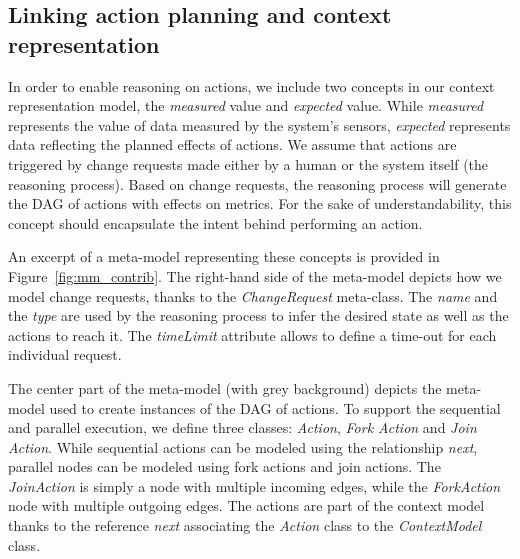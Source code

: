 \subsection{Linking action planning and context representation}


In order to enable reasoning on actions, we include two concepts in our context representation model, the \textit{measured} value and \textit{expected} value.
While \textit{measured} represents the value of data measured by the system's sensors, \textit{expected} represents data reflecting the planned effects of actions.
We assume that actions are triggered by change requests made either by a human or the system itself (\eg the reasoning process).
Based on change requests, the reasoning process will generate the DAG of actions with effects on metrics.
For the sake of understandability, this concept should encapsulate the intent behind performing an action.

An excerpt of a meta-model representing these concepts is provided in Figure~\ref{fig:mm_contrib}.
The right-hand side of the meta-model depicts how we model change requests, thanks to the \textit{ChangeRequest} meta-class.
The \textit{name} and the \textit{type} are used by the reasoning process to infer the desired state as well as the actions to reach it.
The \textit{timeLimit} attribute allows to define a time-out for each individual request.

The center part of the meta-model (with grey background) depicts the meta-model used to create instances of the DAG of actions. 
To support the sequential and parallel execution, we define three classes: \textit{Action}, \textit{Fork Action} and \textit{Join Action}.
While sequential actions can be modeled using the relationship \textit{next}, parallel nodes can be modeled using fork actions and join actions.
The \textit{JoinAction} is simply a node with multiple incoming edges, while the \textit{ForkAction} node with multiple outgoing edges.
The actions are part of the context model thanks to the reference \textit{next} associating the \textit{Action} class to the \textit{ContextModel} class.


